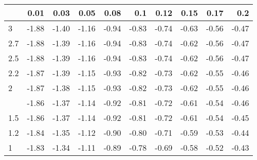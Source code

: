 
\begin{tabular}{lrrrrrrrrr}
\toprule
  & 0.01 & 0.03 & 0.05 & 0.08 & 0.1 & 0.12 & 0.15 & 0.17 & 0.2\\
\midrule
3 & -1.88 & -1.40 & -1.16 & -0.94 & -0.83 & -0.74 & -0.63 & -0.56 & -0.47\\
2.7 & -1.88 & -1.39 & -1.16 & -0.94 & -0.83 & -0.74 & -0.62 & -0.56 & -0.47\\
2.5 & -1.88 & -1.39 & -1.16 & -0.94 & -0.83 & -0.74 & -0.62 & -0.56 & -0.47\\
2.2 & -1.87 & -1.39 & -1.15 & -0.93 & -0.82 & -0.73 & -0.62 & -0.55 & -0.46\\
2 & -1.87 & -1.38 & -1.15 & -0.93 & -0.82 & -0.73 & -0.62 & -0.55 & -0.46\\
\addlinespace
1.7 & -1.86 & -1.37 & -1.14 & -0.92 & -0.81 & -0.72 & -0.61 & -0.54 & -0.46\\
1.5 & -1.86 & -1.37 & -1.14 & -0.92 & -0.81 & -0.72 & -0.61 & -0.54 & -0.45\\
1.2 & -1.84 & -1.35 & -1.12 & -0.90 & -0.80 & -0.71 & -0.59 & -0.53 & -0.44\\
1 & -1.83 & -1.34 & -1.11 & -0.89 & -0.78 & -0.69 & -0.58 & -0.52 & -0.43\\
\bottomrule
\end{tabular}
